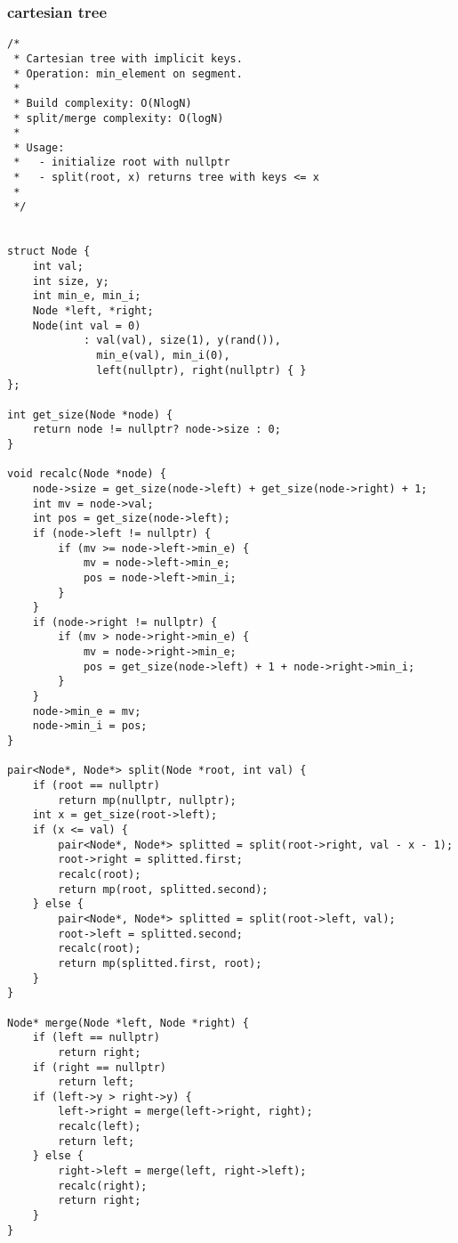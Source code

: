 \subsubsection{cartesian tree}
\begin{lstlisting}
/*
 * Cartesian tree with implicit keys.
 * Operation: min_element on segment.
 *
 * Build complexity: O(NlogN)
 * split/merge complexity: O(logN)
 *
 * Usage:
 *   - initialize root with nullptr
 *   - split(root, x) returns tree with keys <= x
 *
 */


struct Node {
    int val;
    int size, y;
    int min_e, min_i;
    Node *left, *right;
    Node(int val = 0)
            : val(val), size(1), y(rand()),
              min_e(val), min_i(0),
              left(nullptr), right(nullptr) { }
};

int get_size(Node *node) {
    return node != nullptr? node->size : 0;
}

void recalc(Node *node) {
    node->size = get_size(node->left) + get_size(node->right) + 1;
    int mv = node->val;
    int pos = get_size(node->left);
    if (node->left != nullptr) {
        if (mv >= node->left->min_e) {
            mv = node->left->min_e;
            pos = node->left->min_i;
        }
    }
    if (node->right != nullptr) {
        if (mv > node->right->min_e) {
            mv = node->right->min_e;
            pos = get_size(node->left) + 1 + node->right->min_i;
        }
    }
    node->min_e = mv;
    node->min_i = pos;
}

pair<Node*, Node*> split(Node *root, int val) {
    if (root == nullptr)
        return mp(nullptr, nullptr);
    int x = get_size(root->left);
    if (x <= val) {
        pair<Node*, Node*> splitted = split(root->right, val - x - 1);
        root->right = splitted.first;
        recalc(root);
        return mp(root, splitted.second);
    } else {
        pair<Node*, Node*> splitted = split(root->left, val);
        root->left = splitted.second;
        recalc(root);
        return mp(splitted.first, root);
    }
}

Node* merge(Node *left, Node *right) {
    if (left == nullptr)
        return right;
    if (right == nullptr)
        return left;
    if (left->y > right->y) {
        left->right = merge(left->right, right);
        recalc(left);
        return left;
    } else {
        right->left = merge(left, right->left);
        recalc(right);
        return right;
    }
}

\end{lstlisting}
